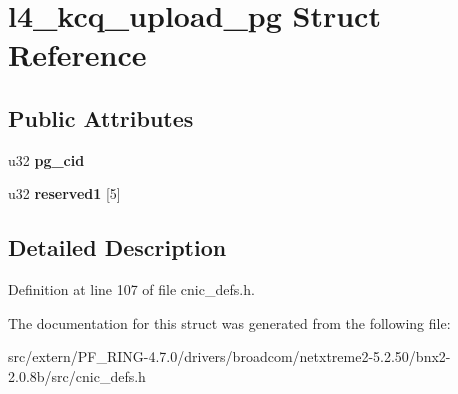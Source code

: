 \hypertarget{structl4__kcq__upload__pg}{
\section{l4\_\-kcq\_\-upload\_\-pg Struct Reference}
\label{structl4__kcq__upload__pg}
}
\subsection*{Public Attributes}
\begin{DoxyCompactItemize}
\item 
\hypertarget{structl4__kcq__upload__pg_a1cd1daba47c485682dd703233aadc036}{
u32 {\bfseries pg\_\-cid}}
\label{structl4__kcq__upload__pg_a1cd1daba47c485682dd703233aadc036}

\item 
\hypertarget{structl4__kcq__upload__pg_a7428a6387ba4c390e7121b19484288d8}{
u32 {\bfseries reserved1} \mbox{[}5\mbox{]}}
\label{structl4__kcq__upload__pg_a7428a6387ba4c390e7121b19484288d8}

\end{DoxyCompactItemize}


\subsection{Detailed Description}


Definition at line 107 of file cnic\_\-defs.h.



The documentation for this struct was generated from the following file:\begin{DoxyCompactItemize}
\item 
src/extern/PF\_\-RING-\/4.7.0/drivers/broadcom/netxtreme2-\/5.2.50/bnx2-\/2.0.8b/src/cnic\_\-defs.h\end{DoxyCompactItemize}

